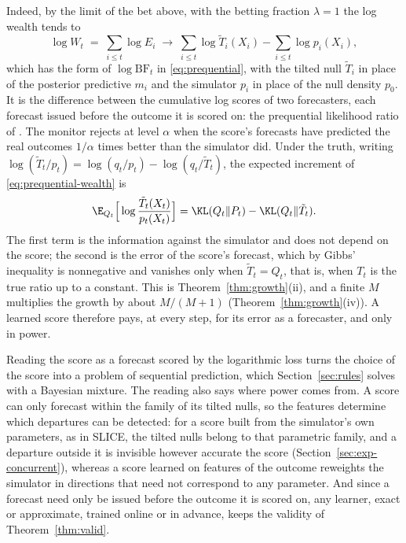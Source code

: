 Indeed, by the limit of the bet above, with the betting fraction
$\lambda = 1$ the log wealth tends to
\begin{equation}\label{eq:prequential-wealth}
\log W_t \;=\; \sum_{i \le t} \log E_i \;\to\; \sum_{i \le t} \log \tilde T_i(X_i)
- \sum_{i \le t} \log p_i(X_i),
\end{equation}
which has the form of $\log \mathrm{BF}_t$ in \eqref{eq:prequential}, with
the tilted null $\tilde T_i$ in place of the posterior predictive $m_i$ and
the simulator $p_i$ in place of the null density $p_0$. It is the difference
between the cumulative log scores of two forecasters, each forecast issued
before the outcome it is scored on: the prequential likelihood ratio of
\citet{dawid1984present}. The monitor rejects at level $\alpha$ when the
score's forecasts have predicted the real outcomes $1/\alpha$ times better
than the simulator did. Under the truth, writing
$\log(\tilde T_t/p_t) = \log(q_t/p_t) - \log(q_t/\tilde T_t)$, the expected
increment of \eqref{eq:prequential-wealth} is
\[
\E_{Q_t}\Big[\log\frac{\tilde T_t(X_t)}{p_t(X_t)}\Big]
= \KL(Q_t\|P_t) - \KL(Q_t\|\tilde T_t).
\]
The first term is the information against the simulator and does not depend
on the score; the second is the error of the score's forecast, which by
Gibbs' inequality is nonnegative and vanishes only when $\tilde T_t = Q_t$,
that is, when $T_t$ is the true ratio up to a constant. This is
Theorem~\ref{thm:growth}(ii), and a finite $M$ multiplies the growth by about
$M/(M+1)$ (Theorem~\ref{thm:growth}(iv)). A learned score therefore pays, at
every step, for its error as a forecaster, and only in power.

Reading the score as a forecast scored by the logarithmic loss turns the
choice of the score into a problem of sequential prediction, which
Section~\ref{sec:rules} solves with a Bayesian mixture. The reading also says
where power comes from. A score can only forecast within the family of its
tilted nulls, so the features determine which departures can be detected: for
a score built from the simulator's own parameters, as in SLICE, the tilted
nulls belong to that parametric family, and a departure outside it is
invisible however accurate the score (Section~\ref{sec:exp-concurrent}),
whereas a score learned on features of the outcome reweights the simulator in
directions that need not correspond to any parameter. And since a forecast
need only be issued before the outcome it is scored on, any learner, exact or
approximate, trained online or in advance, keeps the validity of
Theorem~\ref{thm:valid}.

